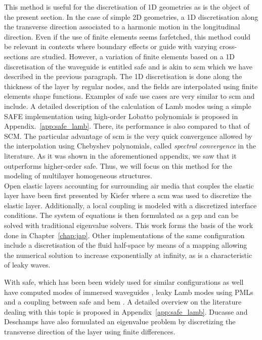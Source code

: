 This method is useful for the discretisation of 1D geometries as is the object of the present section. In the case of simple 2D geometries, a 1D discretisation along the transverse direction associated to a harmonic motion in the longitudinal direction. Even if the use of finite elements seems farfetched, this method could be relevant in contexts where boundary effects or guide with varying cross-sections are studied. However, a variation of finite elements based on a 1D discretisation of the waveguide is entitled \acrfull{safe} and is akin to \acrshort{scm} which we have described in the previous paragraph. The 1D discretisation is done along the thickness of the layer by regular nodes, and the fields are interpolated using finite elements shape functions. Examples of \acrfull{safe} use cases are very similar to \acrshort{scm} and include. A detailed description of the calculation of Lamb modes using a simple SAFE implementation using high-order Lobatto polynomials is proposed in Appendix.~\ref{app:safe_lamb}. There, its performance is also compared to that of SCM. The particular advantage of \acrshort{scm} is the very quick convergence allowed by the interpolation using Chebyshev polynomials, called \emph{spectral convergence} in the literature\cite{trefethen2000,canuto2006,gheorghiu2014}. As it was shown in the aforementioned appendix, we saw that it outperforms higher-order \acrshort{safe}. Thus, we will focus on this method for the modeling of multilayer homogeneous structures. \\

Open elastic layers accounting for surrounding air media that couples the elastic layer have been first presented by Kiefer \etal \cite{kiefer2019} where a \acrshort{scm} was used to discretize the elastic layer. Additionally, a local coupling is modeled with a discretized interface conditions. The system of equations is then formulated as a \acrshort{gep} and can be solved with traditional eigenvalue solvers. This work forms the basis of the work done in Chapter~\ref{chap:jap}. Other implementations of the same configuration include a discretisation of the fluid half-space by means of a mapping allowing the numerical solution to increase exponentially at infinity, as is a characteristic of leaky waves\cite{georgiades2022}. 

With \acrfull{safe}, which has been been widely used for similar configurations as well have computed modes of immersed waveguides \cite{zuo2017}, leaky Lamb modes using PMLs and a coupling between \acrshort{safe} and \acrshort{bem} \cite{mazzotti2013}. A detailed overview on the literature dealing with this topic is proposed in Appendix~\ref{app:safe_lamb}. Ducasse and Deschamps \cite{ducasse2022} have also formulated an eigenvalue problem by discretizing the transverse direction of the layer using finite differences.


